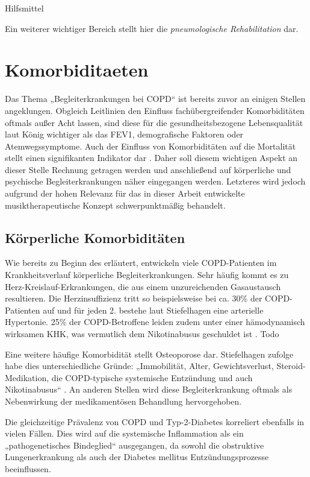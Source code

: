 Hilfsmittel

Ein weiterer wichtiger Bereich stellt hier die \emph{pneumologische Rehabilitation} dar. 

\section{Komorbiditaeten}
\label{komorbiditaeten}
Das Thema „Begleiterkrankungen bei COPD“ ist bereits zuvor an einigen Stellen angeklungen. Obgleich Leitlinien den Einfluss fachübergreifender Komorbiditäten oftmals außer Acht lassen, sind diese für die gesundheitsbezogene Lebensqualität laut König wichtiger als das FEV1, demografische Faktoren oder Atemwegssymptome. Auch der Einfluss von Komorbiditäten auf die Mortalität stellt einen signifikanten Indikator dar \autocite[vgl.][395]{koenig2007}.
Daher soll diesem wichtigen Aspekt an dieser Stelle Rechnung getragen werden und anschließend auf körperliche und psychische Begleiterkrankungen näher eingegangen werden. Letzteres wird jedoch aufgrund der hohen Relevanz für das in dieser Arbeit entwickelte musiktherapeutische Konzept schwerpunktmäßig behandelt.


\subsection{Körperliche Komorbiditäten}
Wie bereits zu Beginn des \label{COPD} erläutert, entwickeln viele COPD-Patienten im Krankheitsverlauf körperliche Begleiterkrankungen. Sehr häufig kommt es zu Herz-Kreislauf-Erkrankungen, die aus einem unzureichenden Gasaustausch resultieren. Die Herzinsuffizienz tritt so beispielsweise bei ca. 30\% der COPD-Patienten auf und für jeden 2. bestehe laut Stiefelhagen eine arterielle Hypertonie. 25\% der COPD-Betroffene leiden zudem unter einer hämodynamisch wirksamen KHK, was vermutlich dem Nikotinabusus geschuldet ist \autocite[vgl.][37]{stiefelhagen2013}. Todo

Eine weitere häufige Komorbidität stellt Osteoporose dar. Stiefelhagen zufolge habe dies unterschiedliche Gründe: „Immobilität, Alter, Gewichtsverlust, Steroid-Medikation, die COPD-typische systemische Entzündung und auch Nikotinabusus“ \autocite[37]{stiefelhagen2013}. An anderen Stellen wird diese Begleiterkrankung oftmals als Nebenwirkung der medikamentösen Behandlung hervorgehoben. 

Die gleichzeitige Prävalenz von COPD und Typ-2-Diabetes korreliert ebenfalls in vielen Fällen. Dies wird auf die systemische Inflammation als ein „pathogenetisches Bindeglied“ ausgegangen, da sowohl die obstruktive Lungenerkrankung als auch der Diabetes mellitus Entzündungsprozesse beeinflussen.


